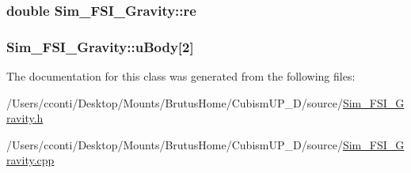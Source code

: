\subsubsection[{re}]{\setlength{\rightskip}{0pt plus 5cm}double Sim\+\_\+\+F\+S\+I\+\_\+\+Gravity\+::re\hspace{0.3cm}{\ttfamily [protected]}}\label{class_sim___f_s_i___gravity_a98ecb780308dab7b8460f1b1366a0b95}
\hypertarget{class_sim___f_s_i___gravity_af025ee4e8818049798588010ed5ec20b}{}
\subsubsection[{u\+Body}]{ Sim\+\_\+\+F\+S\+I\+\_\+\+Gravity\+::u\+Body\mbox{[}2\mbox{]}\hspace{0.3cm}{\ttfamily [protected]}}\label{class_sim___f_s_i___gravity_af025ee4e8818049798588010ed5ec20b}


The documentation for this class was generated from the following files\+:\begin{DoxyCompactItemize}
\item 
/\+Users/cconti/\+Desktop/\+Mounts/\+Brutus\+Home/\+Cubism\+U\+P\+\_\+D/source/\hyperlink{_sim___f_s_i___gravity_8h}{Sim\+\_\+\+F\+S\+I\+\_\+\+Gravity.\+h}\item 
/\+Users/cconti/\+Desktop/\+Mounts/\+Brutus\+Home/\+Cubism\+U\+P\+\_\+D/source/\hyperlink{_sim___f_s_i___gravity_8cpp}{Sim\+\_\+\+F\+S\+I\+\_\+\+Gravity.\+cpp}\end{DoxyCompactItemize}
